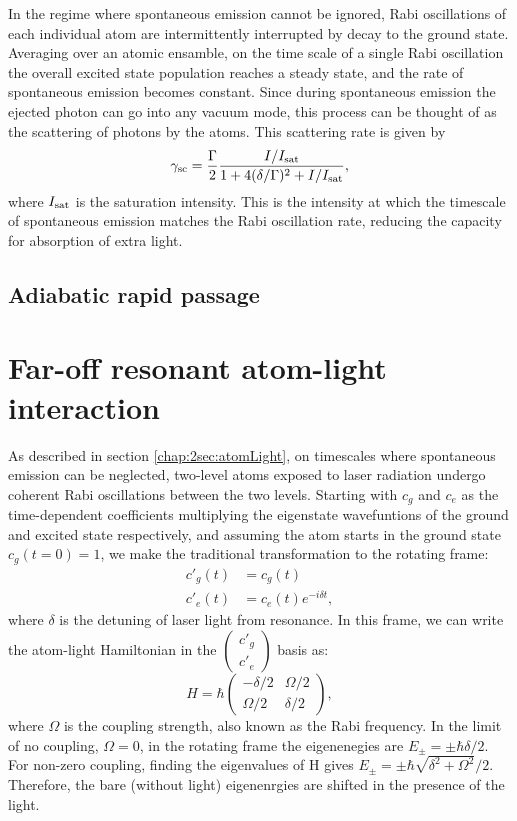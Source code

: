 In the regime where spontaneous emission cannot be ignored, Rabi oscillations of each individual atom are intermittently interrupted by decay to the ground state. Averaging over an atomic ensamble, on the time scale of a single Rabi oscillation the overall excited state population reaches a steady state, and the rate of spontaneous emission becomes constant. Since during spontaneous emission the ejected photon can go into any vacuum mode, this process can be thought of as the scattering of photons by the atoms. This scattering rate is given by\cite{LCT}
\begin{equation}
\gamma_{\rm{sc}}= \frac{\Gamma}{2} \frac{I/I_{\rm{sat}}}{1+4(\delta/\Gamma)^2 +I/I_{\rm{sat}}},
\label{eq:scatrate}
\end{equation}
where $I_{\rm{sat}}$ is the saturation intensity. This is the intensity at which the timescale of spontaneous emission matches the Rabi oscillation rate, reducing the capacity for absorption of extra light.   



\subsection{Adiabatic rapid passage}

\section{Far-off resonant atom-light interaction}

	As described in section \ref{chap:2sec:atomLight}, on timescales where spontaneous emission can be neglected, two-level atoms exposed to laser radiation undergo coherent Rabi oscillations between the two levels. Starting with $c_g$ and $c_e$ as the time-dependent coefficients multiplying the eigenstate wavefuntions of the ground and excited state respectively, and assuming the atom starts in the ground state $c_g(t=0)=1$, we make the traditional transformation to the rotating frame:
\begin{align}
c'_g(t) & = c_g(t)\\
c'_e(t) & = c_e(t) e^{-i\delta t}, 
\end{align}
where $\delta$ is the detuning of laser light from resonance. In this frame, we can write the atom-light Hamiltonian in the $\begin{pmatrix} c'_g \\ c'_e \end{pmatrix}$ basis as:
\begin{equation}
H = \hbar \begin{pmatrix} -\delta/2 & \Omega/2 \\ \Omega/2 & \delta/2 \end{pmatrix},
\end{equation}
where $\Omega$ is the coupling strength, also known as the Rabi frequency. In the limit of no coupling, $\Omega = 0$, in the rotating frame the eigenenegies are $E_{\pm} = \pm \hbar \delta/2$. For non-zero coupling, finding the eigenvalues of H gives $E_{\pm} = \pm \hbar \sqrt{\delta^2 + \Omega^2}/2$. Therefore, the bare (without light) eigenenrgies are shifted in the presence of the light. 

